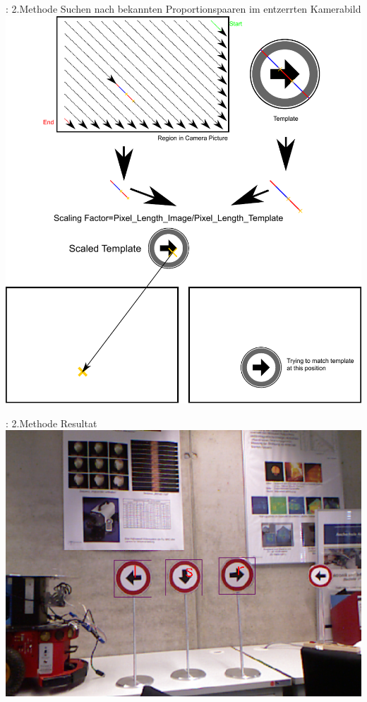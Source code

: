 \documentclass{VLKlauck}
\begin{document}
	\begin{frame}{\insertsubsection: 2.Methode}
		{\small Suchen nach bekannten Proportionspaaren im entzerrten Kamerabild}
		\includegraphics[scale=0.45]{FindingProportions.pdf}
	\end{frame}
	
	
	\begin{frame}{\insertsubsection: 2.Methode}
	{Resultat}
	\includegraphics[width=\textwidth]{three.png}
	\end{frame}
\end{document}
